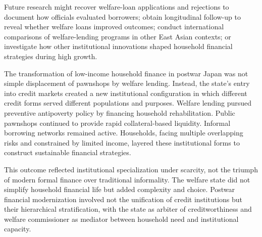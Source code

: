 \documentclass[12pt]{article}
\begin{document}
Future research might recover welfare-loan applications and rejections to document how officials evaluated borrowers; obtain longitudinal follow-up to reveal whether welfare loans improved outcomes; conduct international comparisons of welfare-lending programs in other East Asian contexts; or investigate how other institutional innovations shaped household financial strategies during high growth.

The transformation of low-income household finance in postwar Japan was not simple displacement of pawnshops by welfare lending. Instead, the state's entry into credit markets created a new institutional configuration in which different credit forms served different populations and purposes. Welfare lending pursued preventive antipoverty policy by financing household rehabilitation. Public pawnshops continued to provide rapid collateral-based liquidity. Informal borrowing networks remained active. Households, facing multiple overlapping risks and constrained by limited income, layered these institutional forms to construct sustainable financial strategies.

This outcome reflected institutional specialization under scarcity, not the triumph of modern formal finance over traditional informality. The welfare state did not simplify household financial life but added complexity and choice. Postwar financial modernization involved not the unification of credit institutions but their hierarchical stratification, with the state as arbiter of creditworthiness and welfare commissioner as mediator between household need and institutional capacity.
\end{document}
